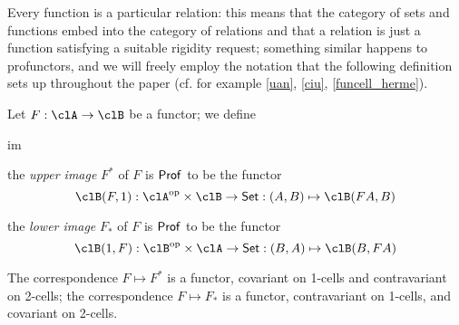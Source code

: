 Every function is a particular relation: this means that the category of sets and functions embed into the category of relations and that a relation is just a function satisfying a suitable rigidity request; something similar happens to profunctors, and we will freely employ the notation that the following definition sets up throughout the paper (cf. for example \autoref{uan}, \autoref{ciu}, \autoref{funcell_herme}).
\begin{definition}\label{upper_n_lower}
  Let $F : \clA \to \clB$ be a functor; we define 
  \begin{enumtag}{im}
    \item the \emph{upper image} $F^*$ of $F$ is $\mathsf{Prof}$ to be the functor 
    \[ \clB(F,1) : \clA^\op\times\clB \to\Set : (A,B)\mapsto \clB(FA,B) \]
    \item the \emph{lower image} $F_*$ of $F$ is $\mathsf{Prof}$ to be the functor 
    \[ \clB(1,F) : \clB^\op\times\clA \to\Set : (B,A)\mapsto \clB(B,FA) \]
  \end{enumtag}
  The correspondence $F\mapsto F^*$ is a functor, covariant on 1-cells and contravariant on 2-cells; the correspondence $F\mapsto F_*$ is a functor, contravariant on 1-cells, and covariant on 2-cells.
\end{definition}
